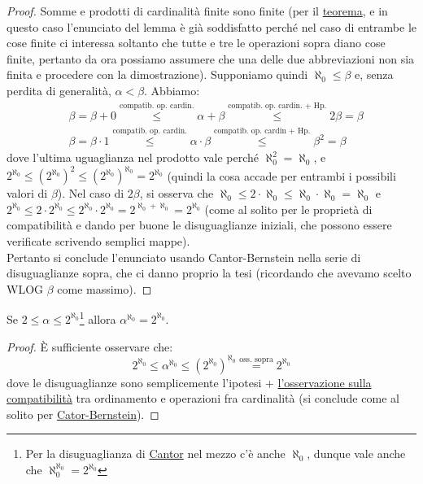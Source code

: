 \documentclass[11pt]{scrartcl}
\begin{document}
\begin{proof}
	Somme e prodotti di cardinalità finite sono finite (per il \hyperref[op_card_fin]{teorema}, e in questo caso l'enunciato del lemma è già soddisfatto perché
	nel caso di entrambe le cose finite ci interessa soltanto che tutte e tre le operazioni sopra diano cose finite, pertanto da ora possiamo assumere che una delle due 
	abbreviazioni non sia finita e procedere con la dimostrazione). Supponiamo quindi $\aleph_0 \leq \beta$ e, senza perdita di generalità, $\alpha < \beta$.
	Abbiamo:
	\begin{align*}
		&\beta = \beta + 0 \overset{\text{compatib. op. cardin.}}{\leq} \alpha + \beta \overset{\text{compatib. op. cardin. + Hp.}}{\leq} 2\beta = \beta \\
		&\beta = \beta \cdot 1 \overset{\text{compatib. op. cardin.}}{\leq} \alpha \cdot \beta \overset{\text{compatib. op. cardin + Hp.}}{\leq} \beta^2 = \beta
	\end{align*}
	dove l'ultima uguaglianza nel prodotto vale perché $\aleph_0^2 = \aleph_0$, e $2^{\aleph_0} \leq (2^{\aleph_0})^2 \leq (2^{\aleph_0})^{\aleph_0}  = 2^{\aleph_0}$ (quindi la cosa accade 
	per entrambi i possibili valori di $\beta$). Nel caso di $2\beta$, si osserva che $\aleph_0 \leq 2 \cdot \aleph_0 \leq \aleph_0 \cdot \aleph_0 = \aleph_0$ e $2^{\aleph_0} \leq 2 \cdot 2^{\aleph_0} \leq 2^{\aleph_0} \cdot 2^{\aleph_0} 
	= 2^{\aleph_0 + \aleph_0} = 2^{\aleph_0}$ (come al solito per le proprietà di compatibilità e dando per buone le disuguaglianze iniziali, che possono essere verificate scrivendo semplici mappe).\\
	Pertanto si conclude l'enunciato usando Cantor-Bernstein nella serie di disuguaglianze sopra, 
	che ci danno proprio la tesi (ricordando che avevamo scelto WLOG $\beta$ come massimo).
\end{proof}

\begin{lemma}[$\alpha^{\aleph_0} = 2^{\aleph_0}$]
	Se $2 \leq \alpha \leq 2^{\aleph_0}$\footnote{Per la disuguaglianza di \hyperref[cantor]{Cantor} nel mezzo c'è anche $\aleph_0$, dunque vale anche che $\aleph_0^{\aleph_0} = 2^{\aleph_0}$} allora $\alpha^{\aleph_0} = 2^{\aleph_0}$.
\end{lemma}

\begin{proof}
	È sufficiente osservare che:
	\[ 2^{\aleph_0} \leq \alpha^{\aleph_0} \leq (2^{\aleph_0})^{\aleph_0} \overset{\text{oss. sopra}}{=} 2^{\aleph_0}
		\]
	dove le disuguaglianze sono semplicemente l'ipotesi + \hyperref[compatibilità_operazioni_cardinalità]{l'osservazione sulla compatibilità} tra ordinamento e operazioni fra cardinalità (si conclude come al solito per \hyperref[CB]{Cator-Bernstein}).
\end{proof}
\end{document}
